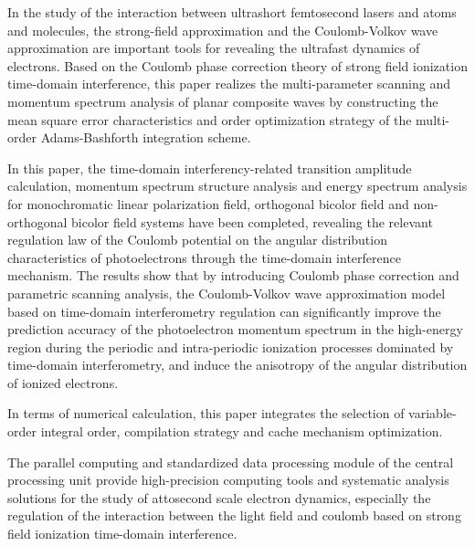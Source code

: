 \begin{englishabstract}
In the study of the interaction between ultrashort femtosecond lasers and atoms and molecules, the strong-field approximation and the Coulomb-Volkov wave approximation are important tools for revealing the ultrafast dynamics of electrons. Based on the Coulomb phase correction theory of strong field ionization time-domain interference, this paper realizes the multi-parameter scanning and momentum spectrum analysis of planar composite waves by constructing the mean square error characteristics and order optimization strategy of the multi-order Adams-Bashforth integration scheme.

In this paper, the time-domain interferency-related transition amplitude calculation, momentum spectrum structure analysis and energy spectrum analysis for monochromatic linear polarization field, orthogonal bicolor field and non-orthogonal bicolor field systems have been completed, revealing the relevant regulation law of the Coulomb potential on the angular distribution characteristics of photoelectrons through the time-domain interference mechanism. The results show that by introducing Coulomb phase correction and parametric scanning analysis, the Coulomb-Volkov wave approximation model based on time-domain interferometry regulation can significantly improve the prediction accuracy of the photoelectron momentum spectrum in the high-energy region during the periodic and intra-periodic ionization processes dominated by time-domain interferometry, and induce the anisotropy of the angular distribution of ionized electrons.

In terms of numerical calculation, this paper integrates the selection of variable-order integral order, compilation strategy and cache mechanism optimization.

The parallel computing and standardized data processing module of the central processing unit provide high-precision computing tools and systematic analysis solutions for the study of attosecond scale electron dynamics, especially the regulation of the interaction between the light field and coulomb based on strong field ionization time-domain interference.

\end{englishabstract}


